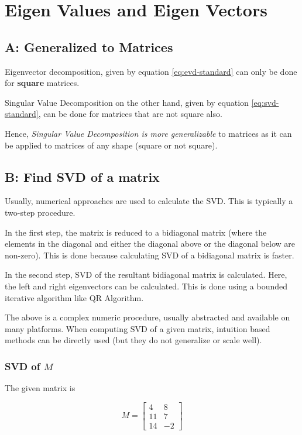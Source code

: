 
\section[Q1: EVD and SVD]{Eigen Values and Eigen Vectors}


\subsection{A: Generalized to Matrices}
Eigenvector decomposition, given by equation \ref{eq:evd-standard} can only be done for \textbf{square} matrices.

\noindent
Singular Value Decomposition on the other hand, given by equation \ref{eq:svd-standard}, can be done for matrices that are not square also.

Hence, \textit{Singular Value Decomposition is more generalizable} to matrices as it can be applied to matrices of any shape (square or not square).

\subsection{B: Find SVD of a matrix}
Usually, numerical approaches are used to calculate the SVD. This is typically a two-step procedure.

In the first step, the matrix is reduced to a bidiagonal matrix (where the elements in the diagonal and either the diagonal above or the diagonal below are non-zero). This is done because calculating SVD of a bidiagonal matrix is faster.

In the second step, SVD of the resultant bidiagonal matrix is calculated. Here, the left and right eigenvectors can be calculated. This is done using a bounded iterative algorithm like QR Algorithm.

The above is a complex numeric procedure, usually abstracted and available on many platforms. When computing SVD of a given matrix, intuition based methods can be directly used (but they do not generalize or scale well).

\subsubsection*{SVD of $M$}

The given matrix is

\begin{equation}
    M = \begin{bmatrix}
        4 & 8 \\
        11 & 7 \\
        14 & -2
        \end{bmatrix}
    \nonumber
\end{equation}

